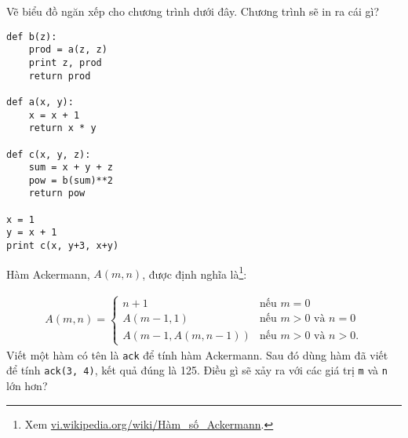 \documentclass[11pt]{book}
\begin{document}
\begin{ex}

Vẽ biểu đồ ngăn xếp cho chương trình dưới đây. Chương trình
sẽ in ra cái gì?

\beforeverb
\begin{verbatim}
def b(z):
    prod = a(z, z)
    print z, prod
    return prod

def a(x, y):
    x = x + 1
    return x * y

def c(x, y, z):
    sum = x + y + z
    pow = b(sum)**2
    return pow

x = 1
y = x + 1
print c(x, y+3, x+y)
\end{verbatim}
\afterverb

\end{ex}


\begin{ex}

Hàm Ackermann, $A(m, n)$, được định nghĩa là\footnote{Xem
  \url{vi.wikipedia.org/wiki/Hàm_số_Ackermann}.}:

\begin{eqnarray}
A(m, n) = \begin{cases} 
              n+1 & \mbox{nếu } m = 0 \\ 
        A(m-1, 1) & \mbox{nếu } m > 0 \mbox{ và } n = 0 \\ 
A(m-1, A(m, n-1)) & \mbox{nếu } m > 0 \mbox{ và } n > 0.
\end{cases} 
\end{eqnarray}
%
Viết một hàm có tên là {\tt ack} để tính hàm Ackermann. Sau đó
dùng hàm đã viết để tính {\tt ack(3, 4)}, kết quả đúng là 125.
Điều gì sẽ xảy ra với các giá trị {\tt m} và {\tt n} lớn hơn?

\end{ex}
\end{document}
